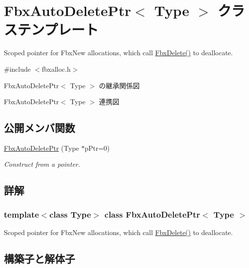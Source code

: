 \hypertarget{class_fbx_auto_delete_ptr}{}\section{Fbx\+Auto\+Delete\+Ptr$<$ Type $>$ クラステンプレート}
\label{class_fbx_auto_delete_ptr}


Scoped pointer for Fbx\+New allocations, which call \hyperlink{fbxalloc_8h_a55138f34ac93c519a78f624178c128d6}{Fbx\+Delete()} to deallocate.  




{\ttfamily \#include $<$fbxalloc.\+h$>$}



Fbx\+Auto\+Delete\+Ptr$<$ Type $>$ の継承関係図


Fbx\+Auto\+Delete\+Ptr$<$ Type $>$ 連携図
\subsection*{公開メンバ関数}
\begin{DoxyCompactItemize}
\item 
\hyperlink{class_fbx_auto_delete_ptr_af2ecfc69aa5dab398213f6e2275e8289}{Fbx\+Auto\+Delete\+Ptr} (Type $\ast$p\+Ptr=0)
\begin{DoxyCompactList}\small\item\em Construct from a pointer. \end{DoxyCompactList}\end{DoxyCompactItemize}


\subsection{詳解}
\subsubsection*{template$<$class Type$>$\newline
class Fbx\+Auto\+Delete\+Ptr$<$ Type $>$}

Scoped pointer for Fbx\+New allocations, which call \hyperlink{fbxalloc_8h_a55138f34ac93c519a78f624178c128d6}{Fbx\+Delete()} to deallocate. 

\subsection{構築子と解体子}
\mbox{\label{class_fbx_auto_delete_ptr_af2ecfc69aa5dab398213f6e2275e8289}} 
